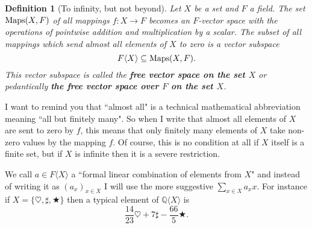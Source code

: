 \documentclass[11pt]{amsbook}
\newtheorem{definition}[theorem]{Definition}
\theoremstyle{definition}
\begin{document}
\begin{definition}[To infinity, but not beyond] \label{mapsvs} Let $X$ be a set and $F$ a field. The set ${\rm Maps}(X,F)$ of all mappings $f:X \to F$ becomes an $F$-vector space with the operations of pointwise addition and multiplication by a scalar. The subset of all mappings which send almost all elements of $X$ to zero is a vector subspace $$F\langle X \rangle \subseteq {\rm Maps}(X,F).$$ This vector subspace is called the {\bf free vector space on the set $X$} or pedantically {\bf the free vector space over $F$ on the set $X$}.
\end{definition}

I want to remind you that ``almost all" is a technical mathematical abbreviation meaning ``all but finitely many". So when I write that almost all elements of $X$ are sent to zero by $f$, this means that only finitely many elements of $X$ take non-zero values by the mapping $f$. Of course, this is no condition at all if $X$ itself is a finite set, but if $X$ is infinite then it is a severe restriction.
\medskip

We call $a\in F\langle X\rangle$ a ``formal linear combination of elements from $X$" and instead of writing it as $(a_x)_{x\in X}$ I will use the more suggestive $\sum_{x\in X}a_x x$. For instance if $X = \{ \heartsuit, \sharp, \bigstar \}$ then a typical element of $\mathbb{Q}\langle X \rangle$ is $$\frac{14}{23}\heartsuit + 7\sharp - \frac{66}{5}\bigstar.$$
\end{document}
